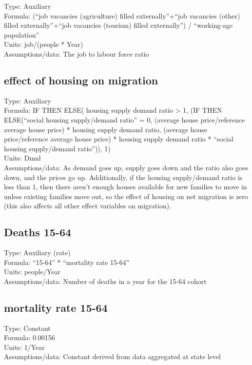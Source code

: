 \documentclass[
  11pt,
]{book}
\begin{document}
Type: Auxiliary\\
Formula: (``job vacancies (agriculture) filled externally''+``job vacancies (other) filled externally''+``job vacancies (tourism) filled externally'') / ``working-age population''\\
Units: job/(people * Year)\\
Assumptions/data: The job to labour force ratio

\hypertarget{effect-of-housing-on-migration}{%
\subsection{effect of housing on migration}\label{effect-of-housing-on-migration}}

Type: Auxiliary\\
Formula: IF THEN ELSE( housing supply demand ratio \textgreater{} 1,
(IF THEN ELSE(``social housing supply/demand ratio'' = 0,
(average house price/reference average house price) * housing supply demand ratio,
(average house price/reference average house price) * housing supply demand ratio * ``social housing supply/demand ratio'')), 1)\\
Units: Dmnl\\
Assumptions/data: As demand goes up, supply goes down and the ratio also goes down, and the prices go up.
Additionally, if the housing supply/demand ratio is less than 1, then there aren't enough houses available for new families to move in unless existing families move out, so the effect of housing on net migration is zero (this also affects all other effect variables on migration).

\hypertarget{deaths-15-64}{%
\subsection{Deaths 15-64}\label{deaths-15-64}}

Type: Auxiliary (rate)\\
Formula: ``15-64'' * ``mortality rate 15-64''\\
Units: people/Year\\
Assumptions/data: Number of deaths in a year for the 15-64 cohort

\hypertarget{mortality-rate-15-64}{%
\subsection{mortality rate 15-64}\label{mortality-rate-15-64}}

Type: Constant\\
Formula: 0.00156\\
Units: 1/Year\\
Assumptions/data: Constant derived from data aggregated at state level
\end{document}
